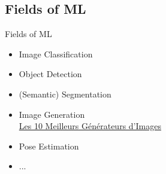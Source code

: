 \documentclass[10pt,serif,mathserif,compress,hyperref={colorlinks}]{beamer}
\begin{document}
\subsection{Fields of ML}

\begin{frame}{Fields of ML}

  \begin{tcolorbox}[height=6cm, add to width=.7cm, title=Computer Vision]
    \begin{minipage}[t][][t]{.6\textwidth}
      \begin{itemize}
      \item<1-> Image Classification
      \item<2-> Object Detection 
      \item<3-> (Semantic) Segmentation
      \item<4-> Image Generation\\
        {\small \href{https://www.leptidigital.fr/productivite/meilleurs-generateurs-images-ia-30857/}{Les 10 Meilleurs Générateurs d’Images}}
      \item<5-> Pose Estimation
      \item<5-> ...
      \end{itemize}
    \end{minipage}\begin{minipage}[t][][b]{.4\textwidth}

\end{minipage}
\end{tcolorbox}
\end{frame}
\end{document}
